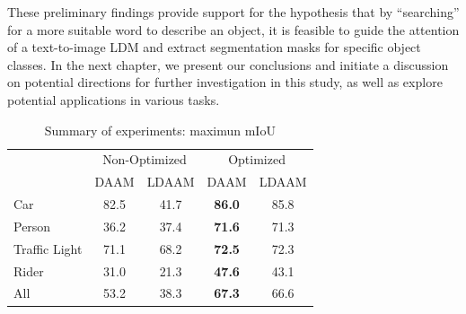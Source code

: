 These preliminary findings provide support for the hypothesis that by ``searching'' for a more suitable word to describe an object, it is feasible to guide the attention of a text-to-image LDM and extract segmentation masks for specific object classes. In the next chapter, we present our conclusions and initiate a discussion on potential directions for further investigation in this study, as well as explore potential applications in various tasks.


\begin{table}[ht]
\centering
\begin{tabular}{l|cc|cc|}
\cline{2-5}
\multirow{2}{*}{}                   & \multicolumn{2}{c|}{Non-Optimized} & \multicolumn{2}{c|}{Optimized}             \\ \cline{2-5} 
                                    & \multicolumn{1}{c|}{DAAM}  & LDAAM & \multicolumn{1}{c|}{DAAM}          & LDAAM \\ \hline
\multicolumn{1}{|l|}{Car}           & \multicolumn{1}{c|}{82.5}  & 41.7  & \multicolumn{1}{c|}{\textbf{86.0}} & 85.8  \\
\multicolumn{1}{|l|}{Person}        & \multicolumn{1}{c|}{36.2}  & 37.4  & \multicolumn{1}{c|}{\textbf{71.6}} & 71.3  \\
\multicolumn{1}{|l|}{Traffic Light} & \multicolumn{1}{c|}{71.1}  & 68.2  & \multicolumn{1}{c|}{\textbf{72.5}} & 72.3  \\
\multicolumn{1}{|l|}{Rider}         & \multicolumn{1}{c|}{31.0}  & 21.3  & \multicolumn{1}{c|}{\textbf{47.6}} & 43.1  \\ \hline
\multicolumn{1}{|l|}{All}           & \multicolumn{1}{c|}{53.2}  & 38.3  & \multicolumn{1}{c|}{\textbf{67.3}} & 66.6  \\ \hline
\end{tabular}
\caption[Summary of experiments: mIoU]{Summary of experiments: maximun mIoU}
    \label{tab:summary-iou-results}
\end{table}



